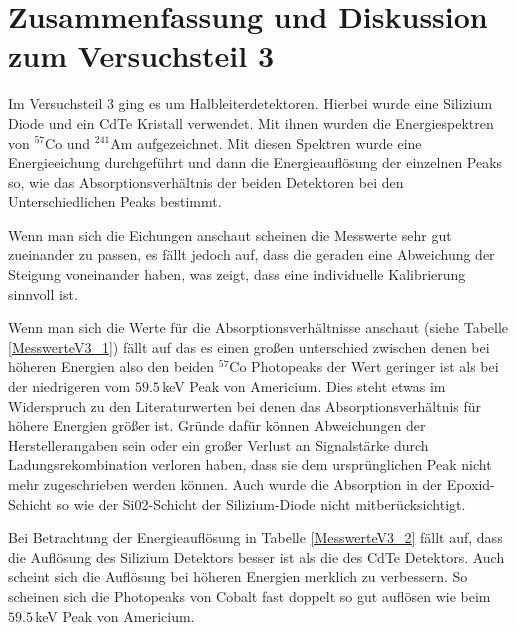 \section{Zusammenfassung und Diskussion zum Versuchsteil 3}
Im Versuchsteil 3 ging es um Halbleiterdetektoren. Hierbei wurde eine Silizium Diode und ein CdTe Kristall verwendet. Mit ihnen wurden die Energiespektren von $^ {57}$Co und $^{241}$Am aufgezeichnet. Mit diesen Spektren wurde eine Energieeichung durchgeführt und dann die Energieauflösung der einzelnen Peaks so, wie das Absorptionsverhältnis der beiden Detektoren bei den Unterschiedlichen Peaks bestimmt.\par
Wenn man sich die Eichungen anschaut scheinen die Messwerte sehr gut zueinander zu passen, es fällt jedoch auf, dass die geraden eine Abweichung der Steigung voneinander haben, was zeigt, dass eine individuelle Kalibrierung sinnvoll ist.\par

Wenn man sich die Werte für die Absorptionsverhältnisse anschaut (siehe Tabelle \ref{MesswerteV3_1}) fällt auf das es einen großen unterschied zwischen denen bei höheren Energien also den beiden $^{57}$Co Photopeaks der Wert geringer ist als bei der niedrigeren vom $59.5\,$keV Peak von Americium. Dies steht etwas im Widerspruch zu den Literaturwerten bei denen das Absorptionsverhältnis für höhere Energien größer ist. Gründe dafür können Abweichungen der Herstellerangaben sein oder ein großer Verlust an Signalstärke durch Ladungsrekombination verloren haben, dass sie dem ursprünglichen Peak nicht mehr zugeschrieben werden können. Auch wurde die Absorption in der Epoxid-Schicht so wie der Si02-Schicht der Silizium-Diode nicht mitberücksichtigt.\par
Bei Betrachtung der Energieauflösung in Tabelle \ref{MesswerteV3_2} fällt auf, dass die Auflösung des Silizium Detektors besser ist als die des CdTe Detektors. Auch scheint sich die Auflösung bei höheren Energien merklich zu verbessern. So scheinen sich die Photopeaks von Cobalt fast doppelt so gut auflösen wie beim $59.5$\,keV Peak von Americium.
